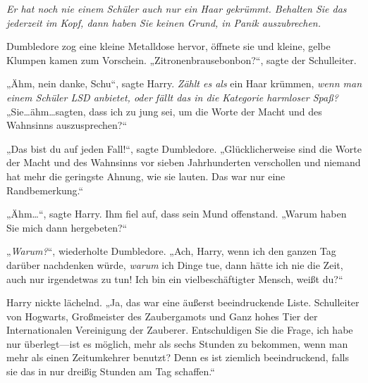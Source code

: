 \emph{Er hat noch nie einem Schüler auch nur ein Haar gekrümmt. Behalten Sie das jederzeit im Kopf, dann haben Sie keinen Grund, in Panik auszubrechen.}

Dumbledore zog eine kleine Metalldose hervor, öffnete sie und kleine, gelbe Klumpen kamen zum Vorschein. „Zitronenbrausebonbon?“, sagte der Schulleiter.

„Ähm, nein danke, Schu“, sagte Harry. \emph{Zählt es als} ein Haar krümmen, \emph{wenn man einem Schüler LSD anbietet, oder fällt das in die Kategorie harmloser Spaß?} „Sie…ähm…sagten, dass ich zu jung sei, um die Worte der Macht und des Wahnsinns auszusprechen?“

„Das bist du auf jeden Fall!“, sagte Dumbledore. „Glücklicherweise sind die Worte der Macht und des Wahnsinns vor sieben Jahrhunderten verschollen und niemand hat mehr die geringste Ahnung, wie sie lauten. Das war nur eine Randbemerkung.“

„Ähm…“, sagte Harry. Ihm fiel auf, dass sein Mund offenstand. „Warum haben Sie mich dann hergebeten?“

„\emph{Warum?}“, wiederholte Dumbledore. „Ach, Harry, wenn ich den ganzen Tag darüber nachdenken würde, \emph{warum} ich Dinge tue, dann hätte ich nie die Zeit, auch nur irgendetwas zu tun! Ich bin ein vielbeschäftigter Mensch, weißt du?“

Harry nickte lächelnd. „Ja, das war eine äußerst beeindruckende Liste. Schulleiter von Hogwarts, Großmeister des Zaubergamots und Ganz hohes Tier der Internationalen Vereinigung der Zauberer. Entschuldigen Sie die Frage, ich habe nur überlegt—ist es möglich, mehr als sechs Stunden zu bekommen, wenn man mehr als einen Zeitumkehrer benutzt? Denn es ist ziemlich beeindruckend, falls sie das in nur dreißig Stunden am Tag schaffen.“

